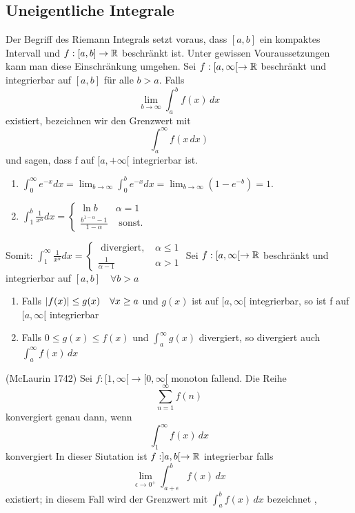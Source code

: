 \subsection{Uneigentliche Integrale}
Der Begriff des Riemann Integrals setzt voraus, dass \( [a,b]\) ein kompaktes Intervall und \(f: [a,b] \rightarrow \mathbb{R} \) beschränkt ist. Unter gewissen Vouraussetzungen kann man diese Einschränkung umgehen. \newline
\Def[5.49] Sei \(f:[a, \infty[ \rightarrow \mathbb{R} \) beschränkt und integrierbar auf \([a,b]\) für alle \( b > a\). Falls
\[ \lim\limits_{b \rightarrow \infty} \int_{a}^{b} f(x) \,dx \]
existiert, bezeichnen wir den Grenzwert mit
\[ \int_{a}^{\infty} f(x \,dx )\]
und sagen, dass f auf \([a, +\infty[ \) integrierbar ist.
\Bsp[5.50]
\begin{enumerate}
    \item $\int_{0}^{\infty} e^{-x} d x=\lim _{b \rightarrow \infty} \int_{0}^{b} e^{-x} d x=\lim _{b \rightarrow \infty}\left(1-e^{-b}\right)=1$.
    \item $\int_{1}^{b} \frac{1}{x^{\alpha}} d x= \begin{cases}\ln b & \alpha=1 \\ \frac{b^{1-\alpha}-1}{1-\alpha} & \text { sonst. }\end{cases}$
\end{enumerate}
Somit: $\int_{1}^{\infty} \frac{1}{x^{\alpha}} d x=\left\{\begin{array}{cc}\text { divergiert, } & \alpha \leq 1 \\ \frac{1}{\alpha-1} & \alpha>1\end{array}\right.$
 Sei \(f:[a, \infty [ \rightarrow \mathbb{R} \) beschränkt und integrierbar auf \([a,b] \quad \forall b > a\)
\begin{enumerate}
    \item [1] Falls \( \left\lvert f(x) \right\rvert \leq g(x) \quad \forall x \geq a \) und \(g(x)\) ist auf \([a, \infty[ \) integrierbar, so ist f auf \([a, \infty[ \) integrierbar
    \item [2] Falls \( 0 \leq g(x) \leq f(x)\) und \(\int_{a}^{\infty} g(x)\) divergiert, so divergiert auch \( \int_{a}^{\infty} f(x) \,dx \)
\end{enumerate}
 (McLaurin 1742) Sei \(f : [1 , \infty[ \rightarrow [0, \infty[ \) monoton fallend. Die Reihe
\[ \sum_{n=1}^{\infty} f(n)\]
konvergiert genau dann, wenn
\[ \int_{1}^{\infty} f(x) \,dx \]
konvergiert
 In dieser Siutation ist \( f: ]a,b[ \rightarrow \mathbb{R} \) integrierbar falls
\[ \lim\limits_{\epsilon \rightarrow 0^{+}} \int_{a + \epsilon}^{b} f(x) \,dx \]
existiert; in diesem Fall wird der Grenzwert mit \(\int_{a}^{b} f(x) \,dx \) bezeichnet
\sep
